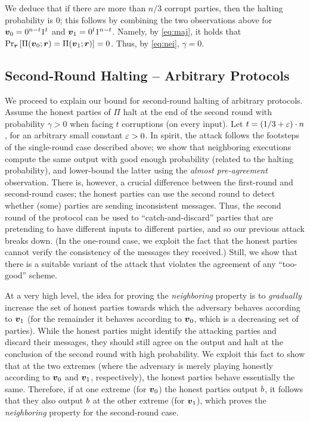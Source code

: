 We deduce that if there are more than $n/3$ corrupt parties, then the halting probability is $0$; this follows by combining the two observations above for ${ \boldsymbol{v}}_0=0^{n-t}1^{t}$ and ${ \boldsymbol{v}}_1=0^{t}1^{n-t}$. Namely, by \cref{eq:maj}, it holds that $\Pr_{{ \boldsymbol{r}}}\left[\Pi({ \boldsymbol{v}}_0;{ \boldsymbol{r}})=\Pi({ \boldsymbol{v}}_1;{ \boldsymbol{r}})\right]=0$. Thus, by \cref{eq:nei}, $\gamma=0$.

\subsection{Second-Round Halting -- Arbitrary Protocols}\label{sec:technique:2}

We proceed to explain our bound for second-round halting of arbitrary protocols. Assume the honest parties of $\Pi$ halt at the end of the second round with probability $\gamma>0$ when facing $t$ corruptions (on every input). Let $t=(1/3+\varepsilon)\cdot n$, for an arbitrary small constant $\varepsilon>0$. In spirit, the attack follows the footsteps of the single-round case described above; we show that neighboring executions compute the same output with good enough probability (related to the halting probability), and lower-bound the latter using the \emph{almost pre-agreement} observation. There is, however, a crucial difference between the first-round and second-round cases; the honest parties can use the second round to detect whether (some) parties are sending inconsistent messages. Thus, the second round of the protocol can be used to ``catch-and-discard'' parties that are pretending to have different inputs to different parties, and so our previous attack breaks down. (In the one-round case, we exploit the fact that the honest parties cannot verify the consistency of the messages they received.) Still, we show that there is a suitable variant of the attack that violates the agreement of any ``too-good'' scheme.

At a very high level, the idea for proving the \emph{neighboring} property is to \emph{gradually} increase the set of honest parties towards which the adversary behaves according to ${ \boldsymbol{v}}_1$ (for the remainder it behaves according to ${ \boldsymbol{v}}_0$, which is a decreasing set of parties). While the honest parties might identify the attacking parties and discard their messages, they should still agree on the output and halt at the conclusion of the second round with high probability. We exploit this fact to show that at the two extremes (where the adversary is merely playing honestly according to ${ \boldsymbol{v}}_0$ and ${ \boldsymbol{v}}_1$, respectively), the honest parties behave essentially the same. Therefore, if at one extreme (for ${ \boldsymbol{v}}_0$) the honest parties output $b$, it follows that they also output $b$ at the other extreme (for ${ \boldsymbol{v}}_1$), which proves the \emph{neighboring} property for the second-round case.


